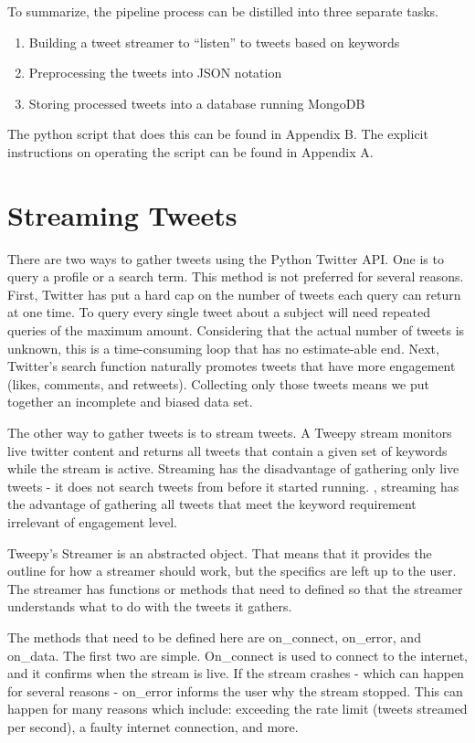 \documentclass[11pt, twoside, reqno]{article}
\begin{document}
To summarize, the pipeline process can be distilled into three separate tasks. 
\begin{enumerate}
	\item Building a tweet streamer to ``listen'' to tweets based on keywords
	\item Preprocessing the tweets into JSON notation
	\item Storing processed tweets into a database running MongoDB 
\end{enumerate}
The python script that does this can be found in Appendix B. The explicit instructions on operating the script can be found in Appendix A. 


\section{Streaming Tweets}
\label{sec:streaming}
\hspace{0.2in} There are two ways to gather tweets using the Python Twitter API. One is to query a profile or a search term. This method is not preferred for several reasons. First, Twitter has put a hard cap on the number of tweets each query can return at one time. To query every single tweet about a subject will need repeated queries of the maximum amount. Considering that the actual number of tweets is unknown, this is a time-consuming loop that has no estimate-able end. Next, Twitter's search function naturally promotes tweets that have more engagement (likes, comments, and retweets). Collecting only those tweets means we put together an incomplete and biased data set. 

The other way to gather tweets is to stream tweets. A Tweepy stream monitors live twitter content and returns all tweets that contain a given set of keywords while the stream is active. Streaming has the disadvantage of gathering only live tweets - it does not search tweets from before it started running. , streaming has the advantage of gathering all tweets that meet the keyword requirement irrelevant of engagement level. 

Tweepy's Streamer is an abstracted object. That means that it provides the outline for how a streamer should work, but the specifics are left up to the user. The streamer has functions or methods that need to defined so that the streamer understands what to do with the tweets it gathers. 

The methods that need to be defined here are on\_connect, on\_error, and on\_data. The first two are simple. On\_connect is used to connect to the internet, and it confirms when the stream is live. If the stream crashes - which can happen for several reasons - on\_error informs the user why the stream stopped. This can happen for many reasons which include: exceeding the rate limit (tweets streamed per second), a faulty internet connection, and more. 
\end{document}
